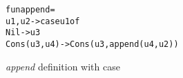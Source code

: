 \documentclass[11pt]{article}
\begin{document}
\begin{figure}[!h]
\begin{alltt}


        fun append = 
          u1,u2 -> case u1 of 
                      Nil -> u3
                      Cons (u3,u4) -> Cons (u3,append(u4,u2))


\end{alltt}
\caption{\textit{append} definition with case} \label{fig:Pmatch:Final}
\end{figure}
\end{document}

